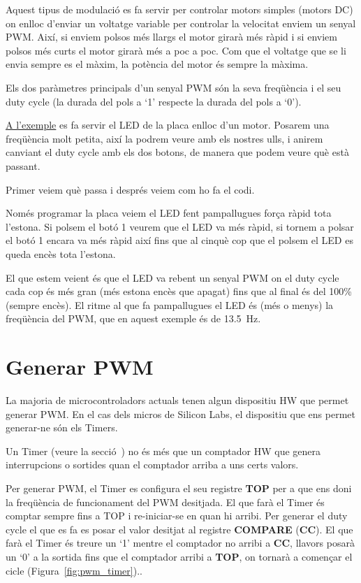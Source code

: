 Aquest tipus de modulació es fa servir per controlar motors simples (motors DC) on enlloc d'enviar un voltatge variable per controlar la velocitat enviem un senyal PWM. Així, si enviem polsos més llargs el motor girarà més ràpid i si enviem polsos més curts el motor girarà més a poc a poc. Com que el voltatge que se li envia sempre es el màxim, la potència del motor és sempre la màxima.

Els dos paràmetres principals d'un senyal PWM són la seva freqüència i el seu \gls{duty cycle} (la durada del pols a ‘1' respecte la durada del pols a ‘0').

\href{https://github.com/mariusmm/cursembedded/tree/master/Simplicity/PWM_1}{A l'exemple} es fa servir el LED de la placa enlloc d'un motor. Posarem una freqüència molt petita, així la podrem veure amb els nostres ulls, i anirem canviant el \gls{duty cycle} amb els dos botons, de manera que podem veure què està passant.

Primer veiem què passa i després veiem com ho fa el codi.

Només programar la placa veiem el LED fent pampallugues força ràpid tota l'estona. Si polsem el botó 1 veurem que el LED va més ràpid, si tornem a polsar el botó 1 encara va més ràpid així fins que al cinquè cop que el polsem el LED es queda encès tota l'estona.

El que estem veient és que el LED va rebent un senyal PWM on el duty cycle cada cop és més gran (més estona encès que apagat) fins que al final és del 100\% (sempre encès). El ritme al que fa pampallugues el LED és (més o menys) la freqüència del PWM, que en aquest exemple és de 13.5~Hz.

\section{Generar PWM}
\label{sub:PWM_example}

La majoria de microcontroladors actuals tenen algun dispositiu HW que permet generar \gls{PWM}. En el cas dels micros de Silicon Labs, el dispositiu que ens permet generar-ne són els \glspl{Timer}.

Un Timer (veure la secció~) no és més que un comptador HW que genera interrupcions o sortides quan el comptador arriba a uns certs valors.

Per generar PWM, el Timer es configura el seu registre {\bf TOP} per a que ens doni la freqüència de funcionament del PWM desitjada. El que farà el Timer és comptar sempre fins a TOP i re-iniciar-se en quan hi arribi. Per generar el \gls{duty cycle} el que es fa es posar el valor desitjat al registre {\bf COMPARE} ({\bf CC}). El que farà el Timer és treure un ‘1' mentre el comptador no arribi a {\bf CC}, llavors posarà un ‘0' a la sortida fins que el comptador arribi a {\bf TOP}, on tornarà a començar el cicle (Figura~\ref{fig:pwm_timer})..


